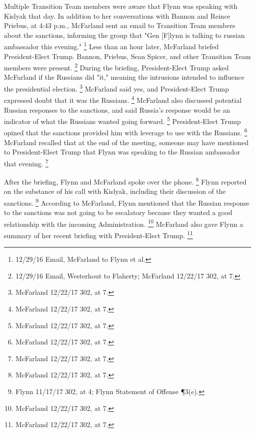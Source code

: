 Multiple Transition Team members were aware that Flynn was speaking with Kislyak that day.
In addition to her conversations with Bannon and Reince Priebus, at 4:43 p.m., McFarland sent an email to Transition Team members about the sanctions, informing the group that "Gen [F]lynn is talking to russian ambassador this evening."%
\footnote{12/29/16 Email, McFarland to Flynn et al.}
Less than an hour later, McFarland briefed President-Elect Trump.
Bannon, Priebus, Sean Spicer, and other Transition Team members were present.%
\footnote{12/29/16 Email, Westerhout to Flaherty;
McFarland 12/22/17 302, at 7.}
During the briefing, President-Elect Trump asked McFarland if the Russians did "it," meaning the intrusions intended to influence the presidential election.%
\footnote{McFarland 12/22/17 302, at 7.}
McFarland said yes, and President-Elect Trump expressed doubt that it was the Russians.%
\footnote{McFarland 12/22/17 302, at 7.}
McFarland also discussed potential Russian responses to the sanctions, and said Russia's response would be an indicator of what the Russians wanted going forward.%
\footnote{McFarland 12/22/17 302, at 7.}
President-Elect Trump opined that the sanctions provided him with leverage to use with the Russians.%
\footnote{McFarland 12/22/17 302, at 7.}
McFarland recalled that at the end of the meeting, someone may have mentioned to President-Elect Trump that Flynn was speaking to the Russian ambassador that evening.%
\footnote{McFarland 12/22/17 302, at 7.}

After the briefing, Flynn and McFarland spoke over the phone.%
\footnote{McFarland 12/22/17 302, at 7.}
Flynn reported on the substance of his call with Kislyak, including their discussion of the sanctions.%
\footnote{Flynn 11/17/17 302, at 4;
Flynn Statement of Offense \P 3(e).}
According to McFarland, Flynn mentioned that the Russian response to the sanctions was not going to be escalatory because they wanted a good relationship with the incoming Administration.%
\footnote{McFarland 12/22/17 302, at 7.}
McFarland also gave Flynn a summary of her recent briefing with President-Elect Trump.%
\footnote{McFarland 12/22/17 302, at 7.}

